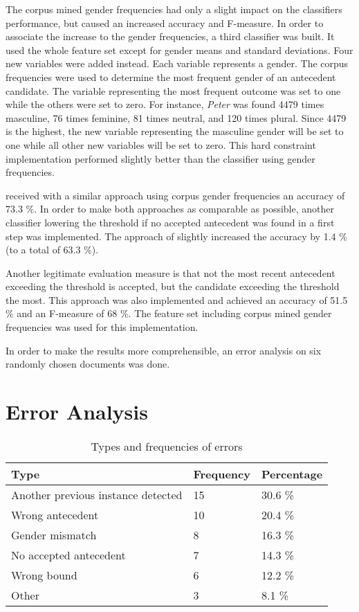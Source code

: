 The corpus mined gender frequencies had only a slight impact on the classifiers performance, but caused an increased accuracy and F-measure. In order to associate the increase to the gender frequencies, a third classifier was built. It used the whole feature set except for gender means and standard deviations. Four new variables were added instead. Each variable represents a gender. The corpus frequencies were used to determine the most frequent gender of an antecedent candidate. The variable representing the most frequent outcome was set to one while the others were set to zero. For instance, \textit{Peter} was found 4479 times masculine, 76 times feminine, 81 times neutral, and 120 times plural. Since 4479 is the highest, the new variable representing the masculine gender will be set to one while all other new variables will be set to zero. This hard constraint implementation performed slightly better than the classifier using gender frequencies.

\cite{bergsma2005automatic} received with a similar approach using corpus gender frequencies an accuracy of 73.3 \%. In order to make both approaches as comparable as possible, another classifier lowering the threshold if no accepted antecedent was found in a first step was implemented. The approach of \cite{bergsma2005automatic} slightly increased the accuracy by 1.4 \% (to a total of 63.3 \%). 

Another legitimate evaluation measure is that not the most recent antecedent exceeding the threshold is accepted, but the candidate exceeding the threshold the most. This approach was also implemented and achieved an accuracy of 51.5 \% and an F-measure of 68 \%. The feature set including corpus mined gender frequencies was used for this implementation.

In order to make the results more comprehensible, an error analysis on six randomly chosen documents was done.

\section{Error Analysis}
\begin{table}[h]
\centering
  \caption{Types and frequencies of errors}
\begin{tabular}{|l|l|l|}
	\hline
	Type & Frequency & Percentage \\ \hline
	\hline
	Another previous instance detected & 15 & 30.6 \% \\ \hline
	Wrong antecedent & 10 & 20.4 \% \\ \hline
	Gender mismatch & 8 & 16.3 \% \\ \hline
	No accepted antecedent & 7 & 14.3 \% \\ \hline
	Wrong bound & 6 & 12.2 \% \\ \hline
	Other & 3 & 8.1 \% \\ \hline
	\end{tabular}

     \label{table:errorFreq}
\end{table}

